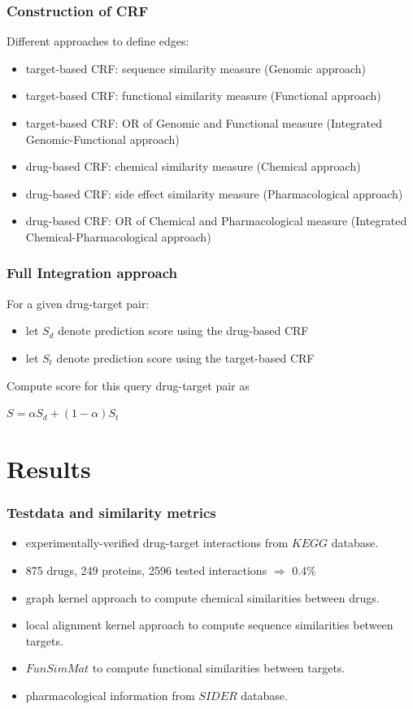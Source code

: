 \documentclass[11pt]{beamer}
\begin{document}
\begin{frame}
\frametitle{Construction of CRF}
Different approaches to define edges:
\begin{itemize}
\item target-based CRF: sequence similarity measure (Genomic approach)
\item target-based CRF: functional similarity measure (Functional approach)
\item target-based CRF: OR of Genomic and Functional measure (Integrated Genomic-Functional approach)
\pause
\item drug-based CRF: chemical similarity measure (Chemical approach)
\item drug-based CRF: side effect similarity measure (Pharmacological approach)
\item drug-based CRF: OR of Chemical and Pharmacological measure (Integrated Chemical-Pharmacological approach)
\end{itemize}
\end{frame}

\begin{frame}
\frametitle{Full Integration approach}
For a given drug-target pair:
\begin{itemize}
\item let $S_d$ denote prediction score using the drug-based CRF 
\item let $S_t$ denote prediction score using the target-based CRF
\end{itemize}
Compute score for this query drug-target pair as
\begin{center}
$S=\alpha S_d + (1-\alpha) S_t$
\end{center}
\end{frame}

\section{Results}
\begin{frame}
\frametitle{Testdata and similarity metrics}
\begin{itemize}
\item experimentally-verified drug-target interactions from $KEGG$ database.
\item 875 drugs, 249 proteins, 2596 tested interactions $\Rightarrow$ 0.4\% 
\item graph kernel approach to compute chemical similarities between drugs.
\item local alignment kernel approach to compute sequence similarities between targets.
\item $FunSimMat$ to compute functional similarities between targets.
\item pharmacological information from $SIDER$ database.
\end{itemize}
\end{frame}
\end{document}

